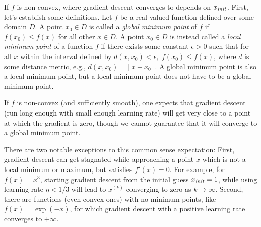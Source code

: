 If $f$ is non-convex, where gradient descent converges to depends on
$x_{\it init}$.  First, let's establish some definitions. 
Let $f$ be a real-valued function defined over some domain $D$.
A point $x_0 \in D$ is called a {\em global minimum point} of $f$ if $f(x_0) \leq f(x)$
for all other $x \in D$. 
A point $x_0 \in D$ is instead called a {\em local minimum point} of a function $f$ if there exists
some constant $\epsilon > 0$ such that for all $x$ within the interval defined by $d(x,x_0) < \epsilon,$
$f(x_0) \leq f(x)$, where $d$ is some distance metric, e.g., $d(x,x_0) = || x - x_0 ||.$
A global minimum point is also a local minimum point, but a local
minimum point does not have to be a global minimum point.

If $f$ is non-convex (and sufficiently smooth),
one expects that
gradient descent (run long enough with small enough learning rate) will get very close to a point at which the gradient is zero, though
we cannot guarantee that it will converge to a global minimum point.

There are two notable exceptions to this common sense expectation: First, gradient descent can get stagnated while approaching a point $x$ which is not a local minimum or maximum,
but satisfies $f'(x)=0$. For example, for $f(x)=x^3$, starting gradient descent from the
initial guess $x_{\it init}=1$, while using learning rate $\eta<1/3$
will lead to $x^{(k)}$ converging to zero as $k\to\infty$. Second, there are functions (even convex ones) with no minimum points,
like $f(x)=\exp(-x)$, for which gradient descent with a positive learning rate converges to $+\infty$.

